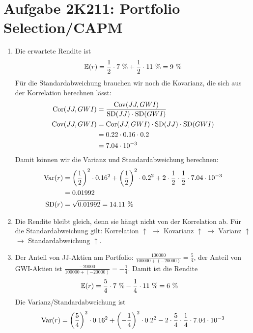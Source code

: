 \documentclass{article}
\newcommand{\E}{\mathbb{E}}
\DeclareMathOperator{\Var}{Var}
\DeclareMathOperator{\Cov}{Cov}
\DeclareMathOperator{\SD}{SD}
\DeclareMathOperator{\Cor}{Cor}
\begin{document}
	\section*{Aufgabe 2K211: Portfolio Selection/CAPM}
	\begin{enumerate}[label=(\alph*)]
		\item Die erwartete Rendite ist
		\begin{align}
			\E(r) = \frac{1}{2}\cdot 7\text{ \%} + \frac{1}{2}\cdot 11\text{ \%} = 9\text{ \%} \notag
		\end{align}
		Für die Standardabweichung brauchen wir noch die Kovarianz, die sich aus der Korrelation berechnen lässt:
		\begin{align}
			\Cor(JJ,GWI) &= \frac{\Cov(JJ,GWI)}{\SD(JJ)\cdot \SD(GWI)} \notag \\
			\Cov(JJ,GWI) &= \Cor(JJ,GWI) \cdot \SD(JJ)\cdot \SD(GWI) \notag \\
			&= 0.22\cdot 0.16\cdot 0.2 \notag \\
			&= 7.04\cdot 10^{-3} \notag
		\end{align}
		Damit können wir die Varianz und Standardabweichung berechnen:
		\begin{align}
			\Var(r) &= \left(\frac{1}{2}\right)^2\cdot 0.16^2 + \left(\frac{1}{2}\right)^2\cdot 0.2^2 + 2\cdot \frac{1}{2}\cdot\frac{1}{2}\cdot 7.04\cdot 10^{-3} \notag \\
			&= 0.01992 \notag \\
			\SD(r) &= \sqrt{0.01992} = 14.11\text{ \%} \notag
		\end{align}
		\item Die Rendite bleibt gleich, denn sie hängt nicht von der Korrelation ab. Für die Standardabweichung gilt: Korrelation $\uparrow$ $\to$ Kovarianz $\uparrow$ $\to$ Varianz $\uparrow$ $\to$ Standardabweichung $\uparrow$.
		\item Der Anteil von JJ-Aktien am Portfolio: $\frac{100000}{100000+(-20000)}=\frac{5}{4}$, der Anteil von GWI-Aktien ist $\frac{-20000}{100000+(-20000)}=-\frac{1}{4}$. Damit ist die Rendite
		\begin{align}
			\E(r) &= \frac{5}{4}\cdot 7\text{ \%} - \frac{1}{4}\cdot 11\text{ \%} = 6\text{ \%} \notag
		\end{align}
		Die Varianz/Standardabweichung ist
		\begin{align}
			\Var(r) &= \left(\frac{5}{4}\right)^2\cdot 0.16^2 + \left(-\frac{1}{4}\right)^2\cdot 0.2^2 - 2\cdot\frac{5}{4}\cdot\frac{1}{4}\cdot 7.04\cdot 10^{-3} \notag \\

\end{align}
\end{enumerate}
\end{document}
